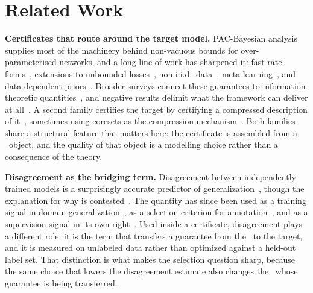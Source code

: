 \section{Related Work}
\label{sec:related-work}

\textbf{Certificates that route around the target model.}
PAC-Bayesian analysis supplies most of the machinery behind non-vacuous bounds
for over-parameterised networks, and a long line of work has sharpened
it: fast-rate forms~\cite{yang2019fastrate, grnwald2021pacbayes}, extensions to
unbounded losses~\cite{casado2024pacbayeschernoff}, non-i.i.d.\ data~\cite{ralaivola2009chromatic},
meta-learning~\cite{farid2021generalization, leblanc2024generalization}, and
data-dependent priors~\cite{dziugaite2018datadependent, pitas2022posteriors}.
Broader surveys connect these guarantees to information-theoretic
quantities~\cite{hellstrm2023generalization}, and negative results delimit what
the framework can deliver at all~\cite{livni2020limitation}. A second family
certifies the target by certifying a compressed description of
it~\cite{arora2018stronger, zhou2018nonvacuous, shin2021compressing,
guha2023generalization, bazinet2024sample}, sometimes using coresets as the
compression mechanism~\cite{baykal2018datadependent}. Both families share a
structural feature that matters here: the certificate is assembled from a
\surrogate\ object, and the quality of that object is a modelling choice rather
than a consequence of the theory.

\textbf{Disagreement as the bridging term.}
Disagreement between independently trained models is a surprisingly accurate
predictor of generalization~\cite{jiang2021assessing}, though the explanation
for why is contested~\cite{kirsch2022assessing}. The quantity has since been
used as a training signal in domain generalization~\cite{zhang2022adaptive},
as a selection criterion for annotation~\cite{benkert2024effective}, and as a
supervision signal in its own right~\cite{daniels2025diverse}. Used inside a
certificate, disagreement plays a different role: it is the term that transfers
a guarantee from the \surrogate\ to the target, and it is measured on unlabeled
data rather than optimized against a held-out label set. That distinction is
what makes the selection question sharp, because the same choice that lowers
the disagreement estimate also changes the \surrogate\ whose guarantee is being
transferred.

